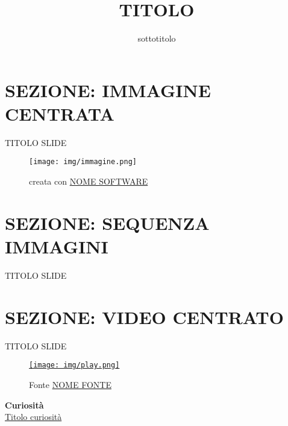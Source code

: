 \documentclass[aspectratio=1610]{beamer}
\title{TITOLO}
\subtitle{sottotitolo}
\date{}
\institute{\textit{
        Fonti:
        \begin{itemize}
            \item[-] \href{www.nomefonte1.it}{NOME FONTE 1}
            \item[-] \href{www.nomefonte2.it}{NOME FONTE 2}
        \end{itemize}
    }
}
\begin{document}
\begin{frame}
    \titlepage
\end{frame}

\section{SEZIONE: IMMAGINE CENTRATA}

\begin{frame}{TITOLO SLIDE}
    \begin{figure}
        \texttt{[image: img/immagine.png]}
        \caption{{creata con \href{www.link.com}{NOME SOFTWARE}}}
    \end{figure}
\end{frame}

\section{SEZIONE: SEQUENZA IMMAGINI}

\begin{frame}{TITOLO SLIDE}
\end{frame}

\section{SEZIONE: VIDEO CENTRATO}

\begin{frame}{TITOLO SLIDE}
    \begin{figure}
        \href{www.link.com}{\texttt{[image: img/play.png]}}
        \caption{{Fonte \href{www.link.com}{NOME FONTE}}}
    \end{figure}
    \bigskip
    \tiny{\textbf{Curiosità}}\\
    \tiny{\href{www.link.com}{Titolo curiosità}}
\end{frame}
\end{document}
